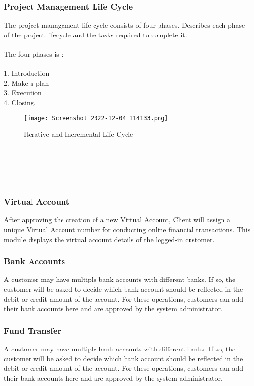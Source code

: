 \documentclass{article}
\begin{document}
\subsubsection{Project Management Life Cycle}
The project management life cycle consists of four phases. Describes each phase of the project lifecycle and the tasks required to complete it.\\\\
The four phases is : 
\\\\
1. Introduction\\
2. Make a plan\\
3. Execution\\
4. Closing. \\

\begin{figure}[htp]
    \centering
    \texttt{[image: Screenshot 2022-12-04 114133.png]}
    \caption{Iterative and Incremental Life Cycle }
    \label{fig:Iterative and Incremental Life Cycle }
\end{figure}
\\\\\\\
\newpage
\subsubsection{Virtual Account}
After approving the creation of a new Virtual Account, Client will assign a unique Virtual Account number for conducting online financial transactions. This module displays the virtual account details of the logged-in customer.
\subsubsection{Bank Accounts}
A customer may have multiple bank accounts with different banks. If so, the customer will be asked to decide which bank account should be reflected in the debit or credit amount of the account. For these operations, customers can add their bank accounts here and are approved by the system administrator.
\subsubsection{Fund Transfer}
A customer may have multiple bank accounts with different banks. If so, the customer will be asked to decide which bank account should be reflected in the debit or credit amount of the account. For these operations, customers can add their bank accounts here and are approved by the system administrator.
\end{document}
